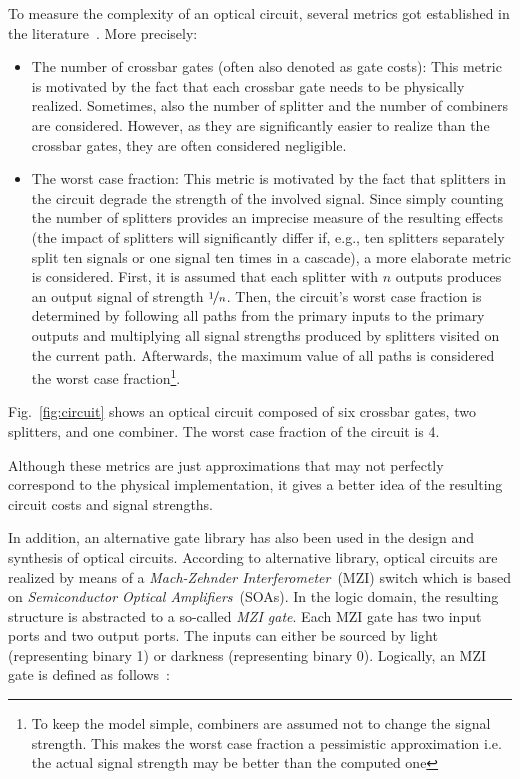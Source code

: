 \documentclass[10pt,letterpaper,twoside,openright]{book}
\begin{document}
To measure the complexity of an optical circuit, several metrics got established in the literature~\cite{Condrat2011,WKHD:2015}. More precisely:
\begin{itemize}
\item The number of crossbar gates (often also denoted as gate costs): This metric is  motivated by the fact that each crossbar gate needs to be physically realized. Sometimes, also the number of splitter and the number of combiners are considered. However, as they are significantly easier to realize than the crossbar gates, they are often considered negligible. 

\item The worst case fraction: This metric is motivated by the fact that splitters in the circuit degrade the strength of the involved signal. Since simply counting the number of splitters provides an imprecise measure of the resulting effects (the impact of splitters will significantly differ if, e.g., ten splitters separately split ten signals or one signal ten times in a cascade), a more elaborate metric is considered. First, it is assumed that each splitter with $n$ outputs produces an output signal of strength $\nicefrac{1}{n}$. Then, the circuit's worst case fraction is determined by following all paths from the primary inputs to the primary outputs and multiplying all signal strengths produced by splitters visited on the current path. Afterwards, the maximum value of all paths is considered the worst case fraction\footnote{To keep the model simple, combiners are assumed not to change the signal strength. This makes the worst case fraction a pessimistic approximation i.e. the actual signal strength may be better than the computed one}.
\end{itemize}

\begin{example}
Fig.~\ref{fig:circuit} shows an optical circuit composed of six crossbar gates, two splitters, and
one combiner. The worst case fraction of the circuit is 4.
\end{example}


Although these metrics are just approximations that may not perfectly correspond to the physical
implementation, it gives a better idea of the resulting circuit costs and signal strengths. 

In addition, an alternative gate library has also been used in the design and synthesis of optical circuits. According to alternative library, optical circuits are realized by means of a
\emph{Mach-Zehnder Interferometer}~(MZI) switch which is based on \emph{Semiconductor Optical Amplifiers}~(SOAs).
In the logic domain, the resulting structure is abstracted to a so-called \emph{MZI gate}.
Each MZI gate has two input ports and two output ports. The inputs can either be sourced by light (representing binary 1) or darkness (representing binary 0). Logically, an MZI gate is defined as follows~\cite{Scaffardi2008,QWang2004}:
\end{document}
